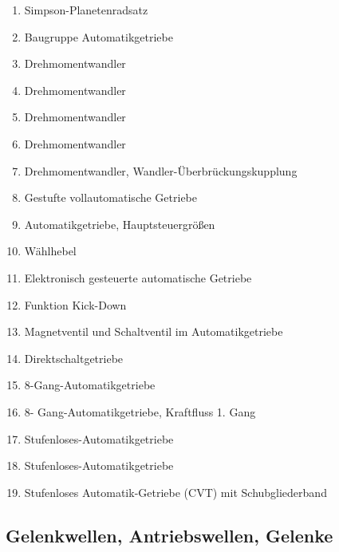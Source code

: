 \begin{enumerate}
\item
  Simpson-Planetenradsatz\\
\item
  Baugruppe Automatikgetriebe\\
\item
  Drehmomentwandler\\
\item
  Drehmomentwandler\\
\item
  Drehmomentwandler\\
\item
  Drehmomentwandler\\
\item
  Drehmomentwandler, Wandler-Überbrückungskupplung\\
\item
  Gestufte vollautomatische Getriebe\\
\item
  Automatikgetriebe, Hauptsteuergrößen\\
\item
  Wählhebel\\
\item
  Elektronisch gesteuerte automatische Getriebe\\
\item
  Funktion Kick-Down\\
\item
  Magnetventil und Schaltventil im Automatikgetriebe\\
\item
  Direktschaltgetriebe\\
\item
  8-Gang-Automatikgetriebe\\
\item
  8- Gang-Automatikgetriebe, Kraftfluss 1. Gang\\
\item
  Stufenloses-Automatikgetriebe\\
\item
  Stufenloses-Automatikgetriebe\\
\item
  Stufenloses Automatik-Getriebe (CVT) mit Schubgliederband
\end{enumerate}

\subsection{Gelenkwellen, Antriebswellen,
Gelenke}\label{gelenkwellen-antriebswellen-gelenke}

